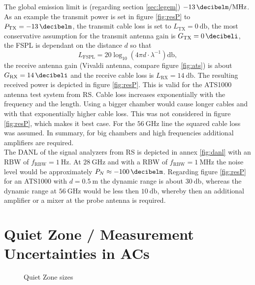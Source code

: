 The global emission limit is (regarding section \ref{sec:legem}) $\SI{-13}{\decibelm\per\mega\hertz}$. As an example the transmit power is set in figure \ref{fig:resP} to $P_{\text{TX}}=\SI{-13}{\decibelm}$, the transmit cable loss is set to $L_{\text{TX}} = \SI{0}{\decibel}$, the most conservative assumption for the transmit antenna gain is $ G_{\text{TX}} = \SI{0}{\decibeli}$, the \ac{FSPL} is dependant on the distance $d$ so that 
\begin{equation}
L_{\text{FSPL}} = 20\log_{10}\left(4\pi d \cdot\lambda^{-1}\right)\si{\decibel},
\label{eq:fspl}
\end{equation}
the receive antenna gain (Vivaldi antenna, compare figure \ref{fig:ats}) is about $ G_{\text{RX}} = \SI{14}{\decibeli}$ and the receive cable loss is $L_{\text{RX}}=\SI{14}{\decibel}$. The resulting received power is depicted in figure \ref{fig:resP}. This is valid for the ATS1000 antenna test system from \ac{RS}. Cable loss increases exponentially with the frequency and the length. Using a bigger chamber would cause longer cables and with that exponentially higher cable loss. This was not considered in figure \ref{fig:resP}, which makes it best case. For the $\SI{56}{\giga\hertz}$ line the squared cable loss was assumed. In summary, for big chambers and high frequencies additional amplifiers are required.\\
The \ac{DANL} of the signal analyzers from \ac{RS} is depicted in annex \ref{fig:danl} with an \ac{RBW} of $f_{\text{RBW}}=\SI{1}{\hertz}$. At $\SI{28}{\giga\hertz}$ and with a \ac{RBW} of $f_{\text{RBW}}=\SI{1}{\mega\hertz}$ the noise level would be approximately $P_N \approx \SI{-100}{\decibelm}$. Regarding figure \ref{fig:resP} for an ATS1000 with $d=\SI{0.5}{\meter}$ the dynamic range is about $\SI{30}{\decibel}$, whereas the dynamic range at $\SI{56}{\giga\hertz}$ would be less then $\SI{10}{\decibel}$, whereby then an additional amplifier or a mixer at the probe antenna is required.

\section{Quiet Zone / Measurement Uncertainties in ACs}

\begin{figure}[h]
  \centering
  \centering
\caption{Quiet Zone sizes}
\label{fig:qz}
\end{figure}

